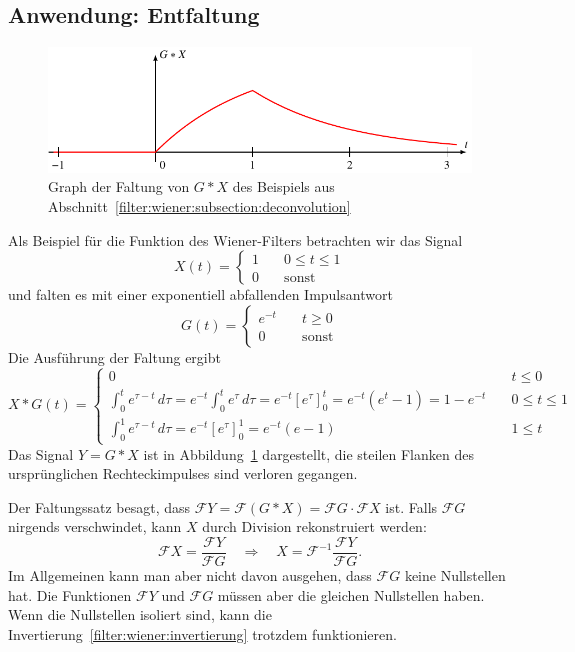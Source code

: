 \subsection{Anwendung: Entfaltung
\label{filter:wiener:subsection:deconvolution}}
\begin{figure}
\centering
\includegraphics{8-filter/images/faltung.pdf}
\caption{Graph der Faltung von $G*X$ des Beispiels aus
Abschnitt~\ref{filter:wiener:subsection:deconvolution}
\label{filter:wiener:faltung:graph}}
\end{figure}
Als Beispiel für die Funktion des Wiener-Filters betrachten wir das Signal 
\[
X(t) = \begin{cases}
1&\quad 0\le t\le 1\\
0&\quad\text{sonst}
\end{cases}
\]
und falten es mit einer exponentiell abfallenden Impulsantwort
\[
G(t)
=
\begin{cases}
e^{-t}&\quad t \ge 0\\
0&\quad \text{sonst}
\end{cases}
\]
Die Ausführung der Faltung ergibt
\begin{equation}
X*G(t)
=
\begin{cases}
0&\quad t\le 0
\\[10pt]
\displaystyle
\int_0^t e^{\tau-t}\,d\tau
=
e^{-t}
\int_0^t e^{\tau}\,d\tau
=
e^{-t}[e^\tau]_0^t
=
e^{-t}(e^t-1)
=
1-e^{-t}
&\quad 0\le t\le 1
\\[10pt]
\displaystyle
\int_0^1 e^{\tau-t}\,d\tau
=
e^{-t}[e^\tau]_0^1
=
e^{-t}(e-1)
&\quad 1\le t
\end{cases}
\end{equation}
Das Signal $Y=G*X$ ist in Abbildung~\ref{filter:wiener:faltung:graph}
dargestellt, die steilen Flanken des ursprünglichen Rechteckimpulses
sind verloren gegangen.

Der Faltungssatz besagt, dass
$\mathcal{F}Y= \mathcal{F} (G*X) = \mathcal{F}G \cdot \mathcal{F}X$
ist.
Falls $\mathcal{F}G$ nirgends verschwindet, kann $X$ durch Division 
rekonstruiert werden:
\begin{equation}
\mathcal{F}X
=
\frac{\mathcal{F}Y}{\mathcal{F}G}
\quad\Rightarrow\quad
X=\mathcal{F}^{-1}
\frac{\mathcal{F}Y}{\mathcal{F}G}.
\label{filter:wiener:invertierung}
\end{equation}
Im Allgemeinen kann man aber nicht davon ausgehen, dass $\mathcal{F}G$
keine Nullstellen hat.
Die Funktionen $\mathcal{F}Y$ und $\mathcal{F}G$ müssen aber die gleichen 
Nullstellen haben.
Wenn die Nullstellen isoliert sind, kann die
Invertierung~\eqref{filter:wiener:invertierung} trotzdem funktionieren.

